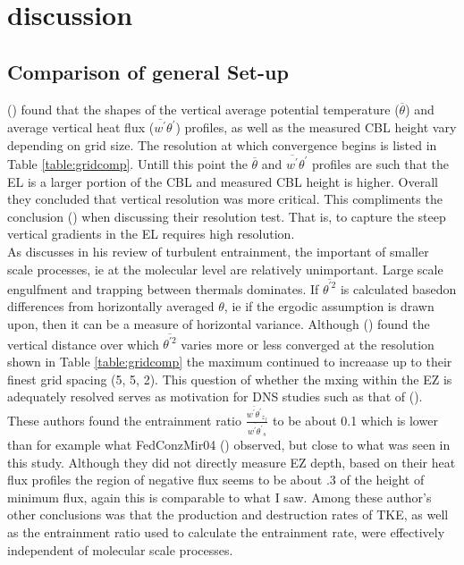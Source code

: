 
\chapter{discussion}
\label{ch:results}
\setlength{\parindent}{0cm}

\section{Comparison of general Set-up}
\FloatBarrier

\citeauthor{SullPat} (\citeyear{SullPat}) found that the shapes of the vertical average potential temperature ($\overline{\theta}$) and average vertical heat flux ($\overline{w^{'}}\theta^{'}$) profiles, as well as the measured \acs{CBL} height vary depending on grid size.  The resolution at which convergence begins is listed in Table \ref{table:gridcomp}.  Untill this point the $\overline{\theta}$ and $\overline{w^{'}}\theta^{'}$ profiles are such that the \acs{EL} is a larger portion of the \acs{CBL} and measured \acs{CBL} height is higher.  Overall they concluded that vertical resolution was more critical.  This compliments the conclusion \citeauthor{BrooksFowler2} (\citeyear{BrooksFowler2}) when discussing their resolution test.  That is, to capture the steep vertical gradients in the \acs{EL} requires high resolution. \\

As \citeauthor{Turner86} discusses in his \citeyear{Turner86} review of turbulent entrainment, the important of smaller scale processes, ie at the molecular level are relatively unimportant.  Large scale engulfment and trapping between thermals dominates.  If $\overline{\theta^{'2}}$ is calculated basedon differences from horizontally averaged $\theta$, ie if the ergodic assumption is drawn upon, then it can be a measure of horizontal variance. Although \citeauthor{SullPat} (\citeyear{SullPat}) found the vertical distance over which $\overline{\theta^{'2}}$ varies more or less converged at the resolution shown in Table \ref{table:gridcomp} the maximum continued to increaase up to their finest grid spacing (5, 5, 2).  This question of whether the mxing within the \acs{EZ} is adequately resolved serves as motivation for \acs{DNS}  studies such as that of \citeauthor{GarciaMellado} (\citeyear{GarciaMellado}). These authors found the entrainment ratio $\frac{\overline{w^{'}\theta^{'}}_{z_{f}}}{\overline{w^{'}\theta^{'}}_{s}}$ to be about 0.1 which is lower than for example what {FedConzMir04} (\citeyear{FedConzMir04}) observed, but close to what was seen in this study. Although they did not directly measure \acs{EZ} depth, based on their heat flux profiles the region of negative flux seems to be about .3 of the height of minimum flux, again this is comparable to what I saw.  Among these author's other conclusions was that the production and destruction rates of \acs{TKE}, as well as the entrainment ratio used to calculate the entrainment rate, were effectively independent of molecular scale processes.\\  
  


